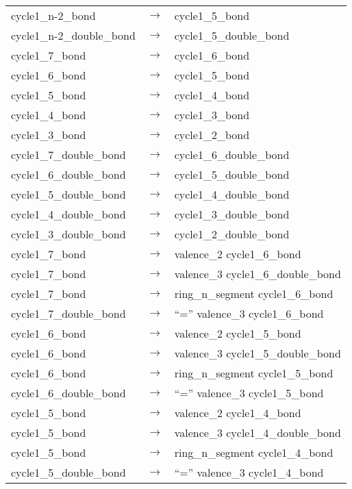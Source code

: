 \documentclass[../Document.tex]{subfiles}
\begin{document}
\begin{longtable}{m{} p{} p{}}
    cycle1\_n-2\_bond & $\rightarrow$ & cycle1\_5\_bond \\
    cycle1\_n-2\_double\_bond & $\rightarrow$ & cycle1\_5\_double\_bond \\
    cycle1\_7\_bond & $\rightarrow$ & cycle1\_6\_bond \\
    cycle1\_6\_bond & $\rightarrow$ & cycle1\_5\_bond \\
    cycle1\_5\_bond & $\rightarrow$ & cycle1\_4\_bond \\
    cycle1\_4\_bond & $\rightarrow$ & cycle1\_3\_bond \\
    cycle1\_3\_bond & $\rightarrow$ & cycle1\_2\_bond \\
    cycle1\_7\_double\_bond & $\rightarrow$ & cycle1\_6\_double\_bond \\
    cycle1\_6\_double\_bond & $\rightarrow$ & cycle1\_5\_double\_bond \\
    cycle1\_5\_double\_bond & $\rightarrow$ & cycle1\_4\_double\_bond \\
    cycle1\_4\_double\_bond & $\rightarrow$ & cycle1\_3\_double\_bond \\
    cycle1\_3\_double\_bond & $\rightarrow$ & cycle1\_2\_double\_bond \\
    cycle1\_7\_bond & $\rightarrow$ & valence\_2 cycle1\_6\_bond \\
    cycle1\_7\_bond & $\rightarrow$ & valence\_3 cycle1\_6\_double\_bond \\
    cycle1\_7\_bond & $\rightarrow$ & ring\_n\_segment cycle1\_6\_bond \\
    cycle1\_7\_double\_bond & $\rightarrow$ & ``='' valence\_3 cycle1\_6\_bond \\
    cycle1\_6\_bond & $\rightarrow$ & valence\_2 cycle1\_5\_bond \\
    cycle1\_6\_bond & $\rightarrow$ & valence\_3 cycle1\_5\_double\_bond \\
    cycle1\_6\_bond & $\rightarrow$ & ring\_n\_segment cycle1\_5\_bond \\
    cycle1\_6\_double\_bond & $\rightarrow$ & ``='' valence\_3 cycle1\_5\_bond \\
    cycle1\_5\_bond & $\rightarrow$ & valence\_2 cycle1\_4\_bond \\
    cycle1\_5\_bond & $\rightarrow$ & valence\_3 cycle1\_4\_double\_bond \\
    cycle1\_5\_bond & $\rightarrow$ & ring\_n\_segment cycle1\_4\_bond \\
    cycle1\_5\_double\_bond & $\rightarrow$ & ``='' valence\_3 cycle1\_4\_bond \\

\end{longtable}
\end{document}
